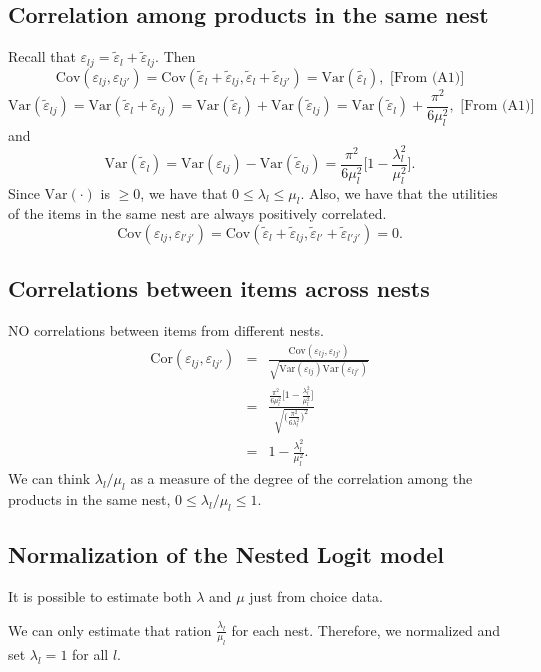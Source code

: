 \documentclass[11pt]{article}
\newcommand{\Var}{\mathrm{Var}}
\newcommand{\Cov}{\mathrm{Cov}}
\newcommand{\Cor}{\mathrm{Cor}}
\begin{document}
\subsection{Correlation among products in the same nest}
Recall that $\varepsilon_{lj} = \tilde{\varepsilon}_l+\tilde{\varepsilon}_{lj}$. Then
$$
\Cov(\varepsilon_{lj},\varepsilon_{lj'}) = \Cov(\tilde{\varepsilon}_l+\tilde{\varepsilon}_{lj},\tilde{\varepsilon}_l+\tilde{\varepsilon}_{lj'})=\Var(\tilde{\varepsilon_l}), \text{ [From (A1)]}
$$
$$
\Var(\tilde{\varepsilon}_{lj}) = \Var(\tilde{\varepsilon}_l+\tilde{\varepsilon}_{lj})=\Var(\tilde{\varepsilon}_l)+\Var(\tilde{\varepsilon}_{lj}) =\Var(\tilde{\varepsilon}_l) + \frac{\pi^2}{6\mu_l^2},  \text{ [From (A1)]}
$$
and 
$$
\Var(\tilde{\varepsilon}_l) = \Var(\varepsilon_{lj}) - \Var(\tilde{\varepsilon}_{lj}) = \frac{\pi^2}{6\mu_l^2} \bigg[1-\frac{\lambda_l^2}{\mu_l^2}\bigg].
$$
Since $\Var(\cdot)$ is $\geq 0$, we have that $0\leq \lambda_l \leq \mu_l$. Also, we have that the utilities of the items in the same nest are always positively correlated.
$$
\Cov(\varepsilon_{lj}, \varepsilon_{l'j'}) = \Cov(\tilde{\varepsilon}_l+\tilde{\varepsilon}_{lj},\tilde{\varepsilon}_{l'}+\tilde{\varepsilon}_{l'j'}) = 0.
$$
\subsection{Correlations between items across nests}
NO correlations between items from different nests.
\begin{eqnarray}
\Cor(\varepsilon_{lj},\varepsilon_{lj'}) &=& \frac{\Cov(\varepsilon_{lj},\varepsilon_{lj'})}{\sqrt{\Var(\varepsilon_{lj})\Var(\varepsilon_{lj'})}}\nonumber\\
&=& \frac{\frac{\pi^2}{6\mu_l^2} \bigg[1-\frac{\lambda_l^2}{\mu_l^2}\bigg]
}{\sqrt{\bigg(\frac{\pi^2}{6\lambda_l^2}\bigg)^2}}\nonumber\\
&=& 1-\frac{\lambda_l^2}{\mu_l^2}. \nonumber
\end{eqnarray}
We can think $\lambda_l/\mu_l$ as a measure of the degree of the correlation among the products in the same nest, $0 \leq \lambda_l/\mu_l \leq 1$.

\subsection{Normalization of the Nested Logit model}
It is possible to estimate both $\lambda$ and $\mu$ just from choice data.

We can only estimate that ration $\frac{\lambda_l}{\mu_l}$ for each nest. Therefore, we normalized and set $\lambda_l=1$ for all $l$.
\end{document}

